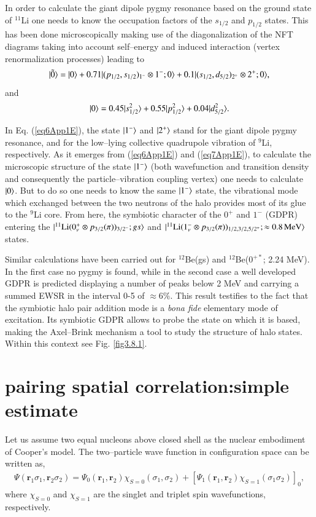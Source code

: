 \begin{subappendices}
In order to calculate the giant dipole pygmy resonance based on the ground state of $^{11}$Li one needs to know the occupation factors of the $s_{1/2}$ and $p_{1/2}$ states. This has been done microscopically making use of the diagonalization of the NFT diagrams taking into account self--energy and induced interaction (vertex renormalization processes) leading to
\begin{align}\label{eq6App1E}
|{\tilde 0} \rangle=|{0} \rangle+0.71|{(p_{1/2},s_{1/2})_{1^-}\otimes1^-;0} \rangle+0.1|{(s_{1/2},d_{5/2})_{2^+}\otimes2^+;0} \rangle,
\end{align}
and 
\begin{align}\label{eq7App1E}
|{0} \rangle=0.45|{s_{1/2}^2} \rangle+0.55|{p_{1/2}^2} \rangle+0.04|{d_{5/2}^2} \rangle.
\end{align}

In Eq. (\ref{eq6App1E}), the state $|{1^-} \rangle$ and $|{2^+} \rangle$ stand for the giant dipole pygmy resonance, and for the low--lying collective quadrupole vibration of $^9$Li, respectively. As it emerges from (\ref{eq6App1E}) and (\ref{eq7App1E}), to calculate the microscopic structure of the state $|{1^-} \rangle$ (both wavefunction and transition density and consequently the particle--vibration coupling vertex) one needs to calculate $|{0} \rangle$. But to do so one needs to know the same $|{1^-} \rangle$ state, the vibrational mode which exchanged between the two neutrons of the halo provides most of its glue to the $^9$Li core. From here, the symbiotic character of the $0^+$ and $1^-$ (GDPR) entering the $|{^{11}\text{Li}(0^+_\nu\otimes p_{3/2}(\pi))_{3/2^-};gs} \rangle$ and $|{^{11}\text{Li}(1^-_\nu\otimes p_{3/2}(\pi))_{1/2,3/2,5/2^+};\approx 0.8\, \text{MeV}} \rangle$ states.


 Similar calculations have been  carried out for $^{12}$Be(gs) and $^{12}$Be($0^{+*}$; 2.24 MeV). In the first case no pygmy is found, while in the second case a well developed GDPR is predicted displaying a number of peaks below 2 MeV and carrying a summed EWSR in the interval 0-5 of $\approx 6\%$. This result testifies to the fact that the symbiotic halo pair addition mode is a \textit{bona fide} elementary mode of excitation. Its symbiotic GDPR allows to probe the state on which it is based, making the Axel--Brink mechanism a tool to study the structure of halo states. Within this context see Fig. \ref{fig3.8.1}. 
\section{pairing spatial correlation:simple estimate}
Let us assume two equal nucleons above closed shell as the nuclear embodiment of Cooper's model. The two--particle wave function in configuration space can be written as,
\begin{align}\label{eq1App3E}
\Psi(\mathbf r_1\sigma_1,\mathbf r_2\sigma_2)=\Psi_0(\mathbf r_1,\mathbf r_2)\chi_{S=0}(\sigma_1,\sigma_2)+\left[\Psi_1(\mathbf r_1,\mathbf r_2)\chi_{S=1}(\sigma_1\sigma_2)\right]_0,
\end{align}
where $\chi_{S=0}$ and $\chi_{S=1}$ are the singlet and triplet spin wavefunctions, respectively.


\end{subappendices}
